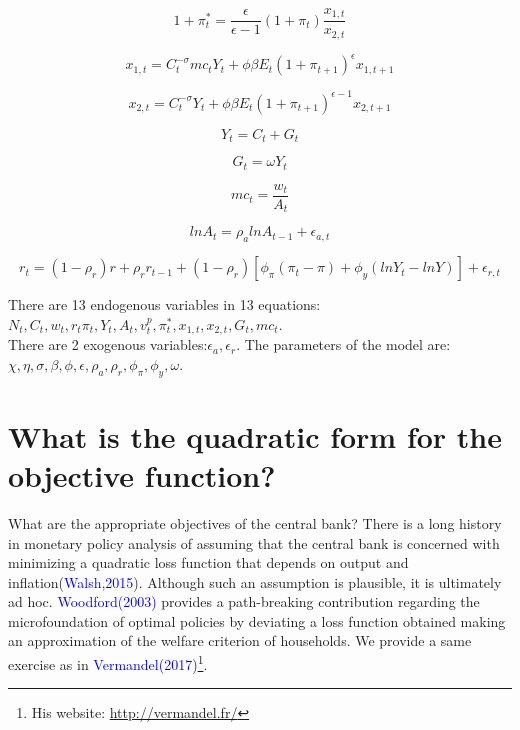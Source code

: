 \documentclass[10pt,math=newtx,citestyle=gb7714-2015,bibstyle=gb7714-2015]{elegantbook}
\begin{document}
{	\begin{equation}
		1+\pi_t^{*}=\frac{\epsilon}{\epsilon-1}(1+\pi_t)\frac{x_{1,t}}{x_{2,t}}
	\end{equation}
	
	\begin{equation}
		x_{1,t}=C_t^{-\sigma}mc_tY_t+\phi \beta E_t(1+\pi_{t+1})^{\epsilon}x_{1,t+1}
	\end{equation}
	
	\begin{equation}
		x_{2,t}=C_t^{-\sigma}Y_t+\phi \beta E_t(1+\pi_{t+1})^{\epsilon-1}x_{2,t+1}
	\end{equation}
	
	\begin{equation}
		Y_t=C_t+G_t
	\end{equation}
	
	\begin{equation}
		G_t=\omega Y_t
	\end{equation}
	
	\begin{equation}
		mc_{t}=\frac{w_t}{A_t}
	\end{equation}
	
	\begin{equation}
		lnA_t=\rho_a lnA_{t-1}+\epsilon_{a,t}
	\end{equation}
	
	\begin{equation}
		r_t=(1-\rho_r)r+\rho_r r_{t-1}+(1-\rho_r)\left[\phi_{\pi}(\pi_t-\pi)+\phi_y\left(lnY_t-lnY\right)\right]+\epsilon_{r,t}
	\end{equation}
	
	There are 13 endogenous variables in 13 equations:\\ $N_t,C_t,w_t,r_t \pi_t,Y_t,A_t,v_t^p,\pi_t^{*},x_{1,t},x_{2,t},G_t,mc_t$. \\There are 2 exogenous variables:$ \epsilon_a,\epsilon_r$. The parameters of the model are:\\$\chi,\eta,\sigma,\beta,\phi,\epsilon,\rho_a,\rho_r,\phi_{\pi},\phi_y,\omega$.
	
	\section{What is the quadratic form for the objective function?}
	
	What are the appropriate objectives of the central bank? There is a long history in monetary policy analysis of assuming that the central bank is concerned with minimizing a quadratic loss function that depends on output and inflation(\textcolor{blue}{Walsh,2015}). Although such an assumption is plausible, it is ultimately ad hoc. \textcolor{blue}{Woodford(2003)} provides a path-breaking contribution regarding the microfoundation of optimal policies by deviating a loss function obtained making an approximation of the welfare criterion of households. We provide a same exercise as in \textcolor{blue}{Vermandel(2017)}\footnote{His website: \url{http://vermandel.fr/}}.
	
}
\end{document}

